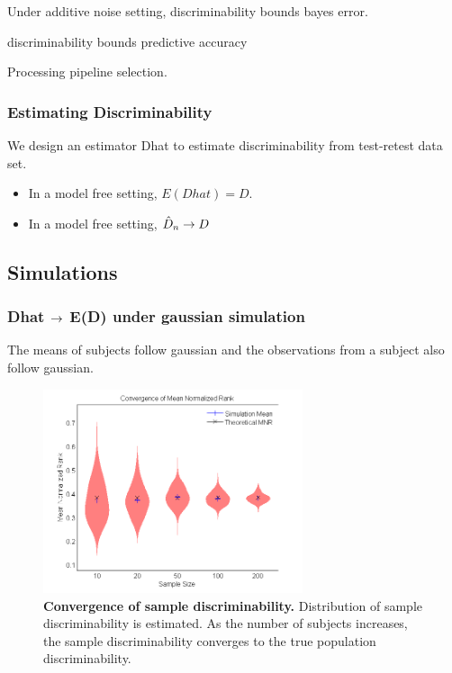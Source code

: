 \documentclass{article}
\begin{document}
 Under additive noise setting, discriminability bounds bayes error.

\begin{thm}
discriminability bounds predictive accuracy
\end{thm}

 Processing pipeline selection.

\subsubsection{Estimating Discriminability}

 We design an estimator Dhat to estimate discriminability from test-retest data set.

\begin{itemize}

\item In a model free setting, $E(Dhat)=D$.

\item In a model free setting, $\hat{D}_n \rightarrow D$
\end{itemize}


\subsection{Simulations}


\subsubsection{Dhat $\rightarrow$ E(D) under gaussian simulation}
 The means of subjects follow gaussian and the observations from a subject also follow gaussian. 

\begin{figure}[ht!]
	\includegraphics[width=3.0in]{../Figs/simumnr_violin.png}
	\caption{{\bf Convergence of sample discriminability.} Distribution of sample discriminability is estimated. As the number of subjects increases, the sample discriminability converges to the true population discriminability. }
	\label{fig:1}
\end{figure}
\end{document}

